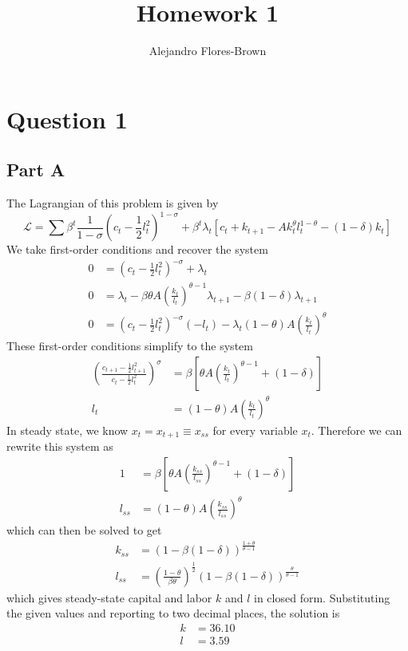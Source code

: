 \documentclass[12pt, letterpaper, parskip = full]{article}
\title{Homework 1}
\author{Alejandro Flores-Brown}
\begin{document}
\maketitle

\section{Question 1}

\subsection{Part A}

The Lagrangian of this problem is given by
\[ \mathcal{L} = \sum \beta^t \frac{1}{1-\sigma} \left(c_t - \frac{1}{2} l_t^2 \right)^{1-\sigma} + \beta^t \lambda_t \left[ c_t + k_{t+1} - A k_t^\theta l_t^{1-\theta} - (1-\delta) k_t  \right] \]
We take first-order conditions and recover the system
\begin{align*}
0 &= \left(c_t - \frac{1}{2} l_t^2\right)^{-\sigma} + \lambda_t \\
0 &= \lambda_t - \beta \theta A \left(\frac{k_t}{l_t}\right)^{\theta-1} \lambda_{t+1} - \beta (1-\delta) \lambda_{t+1} \\
0 &= \left(c_t - \frac{1}{2} l_t^2\right)^{-\sigma} \left(-l_t\right) - \lambda_t (1 - \theta) A \left(\frac{k_t}{l_t}\right)^\theta
\end{align*}
These first-order conditions simplify to the system
\begin{align}
\left(\frac{c_{t+1} - \frac{1}{2} l_{t+1}^2}{c_t - \frac{1}{2} l_t^2}\right)^\sigma &= \beta \left[\theta A \left(\frac{k_t}{l_t}\right)^{\theta-1} + (1-\delta)\right] \\
l_t &= (1-\theta) A \left(\frac{k_t}{l_t}\right)^\theta
\end{align}
In steady state, we know \(x_t = x_{t+1} \equiv x_{ss}\) for every variable \(x_t\). Therefore we can rewrite this system as
\begin{align*}
1 &= \beta \left[\theta A \left(\frac{k_{ss}}{l_{ss}}\right)^{\theta-1} + (1 - \delta) \right] \\
l_{ss} &= (1 - \theta) A \left(\frac{k_{ss}}{l_{ss}}\right)^\theta
\end{align*}
which can then be solved to get
\begin{align}
k_{ss} &= (1-\beta(1-\delta))^{\frac{1+\theta}{\theta-1}} \\
l_{ss} &= \left(\frac{1-\theta}{\beta \theta}\right)^{\frac{1}{2}} (1-\beta(1-\delta))^{\frac{\theta}{\theta-1}}
\end{align}
which gives steady-state capital and labor \(k\) and \(l\) in closed form. Substituting the given values and reporting to two decimal places, the solution is
\begin{align*}
  k &= 36.10 \\
  l &= 3.59
\end{align*}
\end{document}
